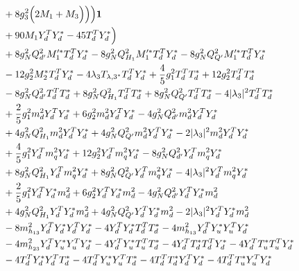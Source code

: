 {\begin{align}
& + 8 g_{3}^{2} \Big(2 M_1  + M_3\Big)\Big)\Big){\bf 1} \nonumber \\ 
 &+90 M_1 {Y_{d}^{T}  Y_d^*} -45 {T_{d}^{T}  Y_d^*} \Big)\nonumber \\ 
 &+8 g_{N}^{2} Q_{d'}^{2} M_1'^* {T_{d}^{T}  Y_d^*} -8 g_{N}^{2} Q_{H_1}^{2} M_1'^* {T_{d}^{T}  Y_d^*} -8 g_{N}^{2} Q_{Q'}^{2} M_1'^* {T_{d}^{T}  Y_d^*} \nonumber \\ 
 &-12 g_{2}^{2} M_2^* {T_{d}^{T}  Y_d^*} -4 \lambda_3 T_{{\lambda,3}^*} {T_{d}^{T}  Y_d^*} +\frac{4}{5} g_{1}^{2} {T_{d}^{T}  T_d^*} +12 g_{2}^{2} {T_{d}^{T}  T_d^*} \nonumber \\ 
 &-8 g_{N}^{2} Q_{d'}^{2} {T_{d}^{T}  T_d^*} +8 g_{N}^{2} Q_{H_1}^{2} {T_{d}^{T}  T_d^*} +8 g_{N}^{2} Q_{Q'}^{2} {T_{d}^{T}  T_d^*} -4 |\lambda_3|^2 {T_{d}^{T}  T_d^*} \nonumber \\ 
 &+\frac{2}{5} g_{1}^{2} {m_d^2  Y_{d}^{T}  Y_d^*} +6 g_{2}^{2} {m_d^2  Y_{d}^{T}  Y_d^*} -4 g_{N}^{2} Q_{d'}^{2} {m_d^2  Y_{d}^{T}  Y_d^*} \nonumber \\ 
 &+4 g_{N}^{2} Q_{H_1}^{2} {m_d^2  Y_{d}^{T}  Y_d^*} +4 g_{N}^{2} Q_{Q'}^{2} {m_d^2  Y_{d}^{T}  Y_d^*} -2 |\lambda_3|^2 {m_d^2  Y_{d}^{T}  Y_d^*} \nonumber \\ 
 &+\frac{4}{5} g_{1}^{2} {Y_{d}^{T}  m_q^2  Y_d^*} +12 g_{2}^{2} {Y_{d}^{T}  m_q^2  Y_d^*} -8 g_{N}^{2} Q_{d'}^{2} {Y_{d}^{T}  m_q^2  Y_d^*} \nonumber \\ 
 &+8 g_{N}^{2} Q_{H_1}^{2} {Y_{d}^{T}  m_q^2  Y_d^*} +8 g_{N}^{2} Q_{Q'}^{2} {Y_{d}^{T}  m_q^2  Y_d^*} -4 |\lambda_3|^2 {Y_{d}^{T}  m_q^2  Y_d^*} \nonumber \\ 
 &+\frac{2}{5} g_{1}^{2} {Y_{d}^{T}  Y_d^*  m_d^2} +6 g_{2}^{2} {Y_{d}^{T}  Y_d^*  m_d^2} -4 g_{N}^{2} Q_{d'}^{2} {Y_{d}^{T}  Y_d^*  m_d^2} \nonumber \\ 
 &+4 g_{N}^{2} Q_{H_1}^{2} {Y_{d}^{T}  Y_d^*  m_d^2} +4 g_{N}^{2} Q_{Q'}^{2} {Y_{d}^{T}  Y_d^*  m_d^2} -2 |\lambda_3|^2 {Y_{d}^{T}  Y_d^*  m_d^2} \nonumber \\ 
 &-8 m_{h_{13}}^2 {Y_{d}^{T}  Y_d^*  Y_{d}^{T}  Y_d^*} -4 {Y_{d}^{T}  Y_d^*  T_{d}^{T}  T_d^*} -4 m_{h_{13}}^2 {Y_{d}^{T}  Y_u^*  Y_{u}^{T}  Y_d^*} \nonumber \\ 
 &-4 m_{h_{23}}^2 {Y_{d}^{T}  Y_u^*  Y_{u}^{T}  Y_d^*} -4 {Y_{d}^{T}  Y_u^*  T_{u}^{T}  T_d^*} -4 {Y_{d}^{T}  T_d^*  T_{d}^{T}  Y_d^*} -4 {Y_{d}^{T}  T_u^*  T_{u}^{T}  Y_d^*} \nonumber \\ 
 &-4 {T_{d}^{T}  Y_d^*  Y_{d}^{T}  T_d^*} -4 {T_{d}^{T}  Y_u^*  Y_{u}^{T}  T_d^*} -4 {T_{d}^{T}  T_d^*  Y_{d}^{T}  Y_d^*} -4 {T_{d}^{T}  T_u^*  Y_{u}^{T}  Y_d^*} \nonumber \\ 

\end{align}}

